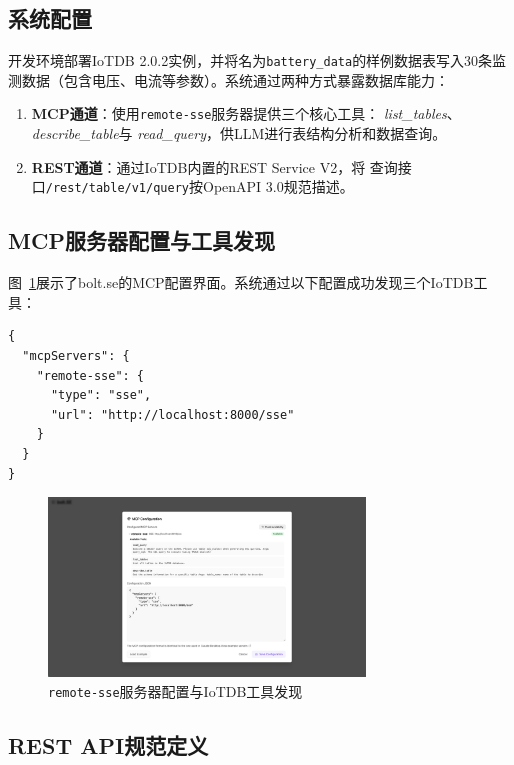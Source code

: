 \subsection{系统配置}

开发环境部署IoTDB 2.0.2实例，并将名为\texttt{battery\_data}的样例数据表写入30条监测数据（包含电压、电流等参数）。系统通过两种方式暴露数据库能力：

\begin{enumerate}
  \item \textbf{MCP通道}：使用\texttt{remote-sse}服务器提供三个核心工具：
        \textit{list\_tables}、\textit{describe\_table}与
        \textit{read\_query}，供LLM进行表结构分析和数据查询。
  \item \textbf{REST通道}：通过IoTDB内置的REST Service V2，将
        查询接口\texttt{/rest/table/v1/query}按OpenAPI 3.0规范描述。
\end{enumerate}

\subsection{MCP服务器配置与工具发现}

图~\ref{fig:mcp-config}展示了bolt.se的MCP配置界面。系统通过以下配置成功发现三个IoTDB工具：

\begin{verbatim}
{
  "mcpServers": {
    "remote-sse": {
      "type": "sse",
      "url": "http://localhost:8000/sse"
    }
  }
}
\end{verbatim}

\begin{figure}[htbp]
  \centering
  \includegraphics[width=0.75\textwidth]{figures/screenshots/iotdb-demo/mcp-config.png}
  \caption{\texttt{remote-sse}服务器配置与IoTDB工具发现}
  \label{fig:mcp-config}
\end{figure}

\subsection{REST API规范定义}

